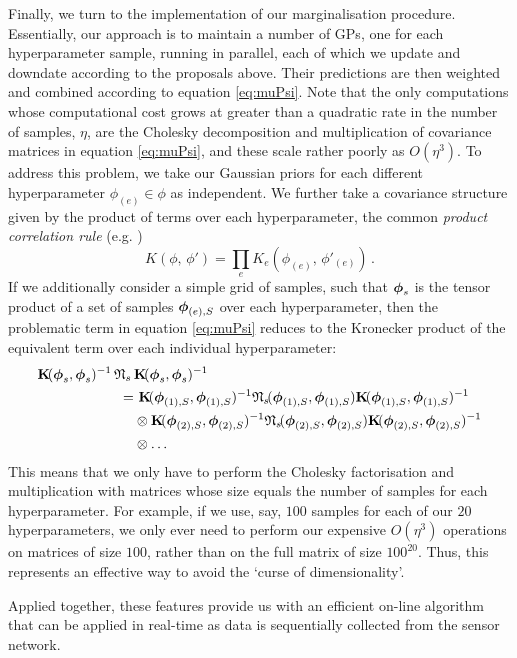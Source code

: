 \documentclass{acmtrans2m}
\begin{document}
Finally, we turn to the implementation of our marginalisation procedure. Essentially, our approach is to maintain a number of GPs, one for each hyperparameter sample, running in parallel, each of which we update and downdate according to the proposals above. Their predictions are then weighted and combined according to equation \eqref{eq:muPsi}. Note that the only computations whose computational cost grows at greater than a quadratic rate in the number of samples, $\eta$, are the Cholesky decomposition and multiplication of covariance matrices in equation \eqref{eq:muPsi}, and these scale rather poorly as $O(\eta^3)$. To address this problem, we take our Gaussian priors for each different hyperparameter $\phi_{(e)} \in \phi$ as independent. We further take a covariance structure given by the product of terms over each hyperparameter, the common \emph{product correlation rule} (e.g. )
\begin{equation}
 K(\phi,\,\phi')=\prod_e K_e(\phi_{(e)},\,\phi'_{(e)})\,.
\end{equation}
If we additionally consider a simple grid of samples, such that $\boldsymbol{\phi}_s$ is the tensor product of a set of samples $\boldsymbol{\phi}_{(e),S}$ over each hyperparameter, then the problematic term in equation \eqref{eq:muPsi} reduces to the Kronecker product of the equivalent term over each individual hyperparameter:
\begin{align}\label{eq:KNK}
\mat{K} \!(\vph_s,\vph_s)^{-1}\,\Nt\,&\mat{K}\!(\vph_s,\vph_s)^{-1}\nonumber\\
 = & ~\mat{K}\!(\vph_{(1),S},\vph_{(1),S})^{-1}\Nt\!(\vph_{(1),S},\vph_{(1),S})\mat{K}\!(\vph_{(1),S},\vph_{(1),S})^{-1}\nonumber\\ & \otimes \mat{K}\!(\vph_{(2),S},\vph_{(2),S})^{-1}\Nt\!(\vph_{(2),S},\vph_{(2),S})\mat{K}\!(\vph_{(2),S},\vph_{(2),S})^{-1}\nonumber\\ & \otimes \ldots
\end{align}
This means that we only have to perform the Cholesky factorisation and multiplication with matrices whose size equals the number of samples for each hyperparameter. For example, if we use, say, $100$ samples for each of our $20$ hyperparameters, we only ever need to perform our expensive $O(\eta^3)$ operations on matrices of size $100$, rather than on the full matrix of size $100^{20}$. Thus, this represents an effective way to avoid the `curse of dimensionality'. 

Applied together, these features provide us with an efficient on-line algorithm that can be applied in real-time as data is sequentially collected from the sensor network.
\end{document}
